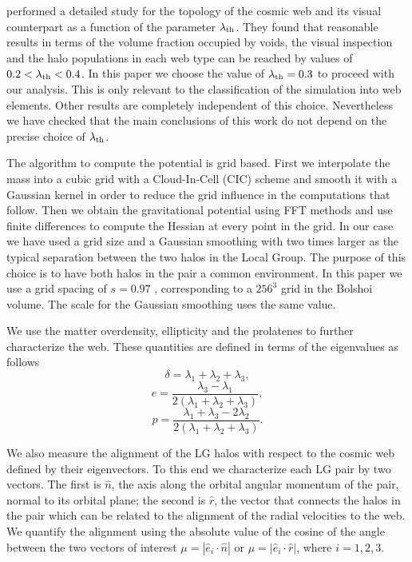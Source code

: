 \documentclass{emulateapj}
\newcommand{\manuscript}{paper }
\newcommand{\hMpc}{{\ifmmode{h^{-1}{\rm Mpc}}\else{$h^{-1}$Mpc }\fi}}
\begin{document}
\cite{Tweb} performed a detailed study for the topology of the
cosmic web and its visual counterpart as a function of the parameter
$\lambda_{\rm th}$. 
They found that reasonable results in terms of the
volume fraction occupied by voids, the visual inspection and the halo
populations in each web type can be reached by values of $0.2<\lambda_{\rm
th}<0.4$. 
In this \manuscript we choose the value of $\lambda_{\rm
  th}=0.3$ to proceed with our analysis. 
This is only relevant to the classification of the simulation into web
elements. Other results are completely independent of this
choice. Nevertheless we have checked that the main conclusions of this
work do not depend on the precise choice of $\lambda_{\rm th}$.


The algorithm to compute the potential is grid based. 
First we interpolate the mass into a cubic grid with a
Cloud-In-Cell (CIC) scheme and smooth it with a Gaussian kernel in order to reduce the grid influence in the computations that follow. 
Then we obtain the gravitational potential using FFT methods and use finite differences
to compute the Hessian at every point in the grid. 
In our case we have used a grid size and a Gaussian smoothing with
two times larger as the typical separation between the two halos in the Local Group. 
The purpose of this choice is to have both halos in the pair a common
environment. 
In this \manuscript we use a grid spacing of $s=0.97$ \hMpc,
corresponding to a $256^3$ grid in the Bolshoi volume. 
The scale for the Gaussian smoothing uses the same value. 

We use the matter overdensity, ellipticity and the prolatenes to
further characterize the web. 
These quantities are defined in terms of the
eigenvalues as follows 
%
\begin{equation}
\delta = \lambda_1 + \lambda_2 + \lambda_3,
\end{equation}
%
\begin{equation}
e= \frac{\lambda_3 - \lambda_1}{2(\lambda_1 + \lambda_2 + \lambda_3)}, 
\end{equation}
%
\begin{equation}
p= \frac{\lambda_1 + \lambda_3 - 2\lambda_2}{2(\lambda_1 + \lambda_2 +
  \lambda_3)}.
\end{equation}

We also measure the alignment of the LG halos with respect to the
cosmic web defined by their eigenvectors.
To this end we characterize each LG pair by two vectors. 
The first is $\hat{n}$, the axis along the orbital angular
momentum of the pair, normal to its orbital plane; the second is
$\hat{r}$, the vector that connects the halos in the pair which can be
related to the alignment of the radial velocities to the web.
We quantify the alignment using the absolute value of the cosine of
the angle between the two vectors of interest $\mu=|\hat{e}_i \cdot
\hat{n}|$ or $\mu=|\hat{e}_i\cdot \hat{r}|$, where $i=1,2,3$. 
\end{document}
